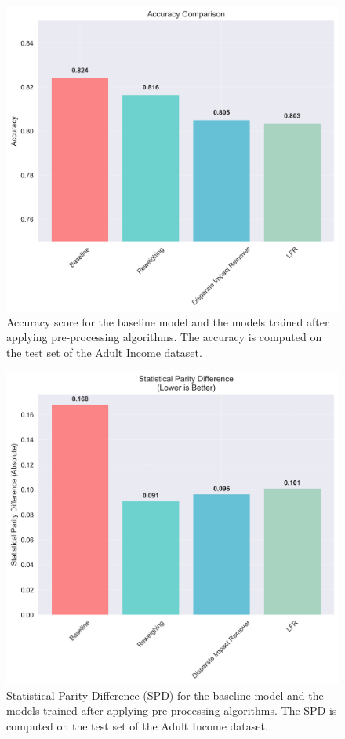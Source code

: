 \documentclass[12pt,a4paper,openright,twoside]{book}
\begin{document}
\begin{figure}
    \centering
    \includegraphics[width=\textwidth]{figures/preprocessing_results/accuracy_comparison_chart.png}
    \caption{Accuracy score for the baseline model and the models trained after applying pre-processing algorithms. The accuracy is computed on the test set of the Adult Income dataset.}
    \label{fig:baseline_results}
\end{figure}

\begin{figure}
    \centering
    \includegraphics[width=\textwidth]{figures/preprocessing_results/spd_comparison_chart.png}
    \caption{Statistical Parity Difference (SPD) for the baseline model and the models trained after applying pre-processing algorithms. The SPD is computed on the test set of the Adult Income dataset.}
    \label{fig:preprocessing_results}
\end{figure}
\end{document}
